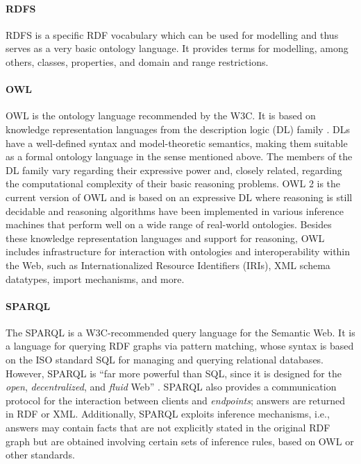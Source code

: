 \paragraph{RDFS}
\gls{RDFS} is a specific \gls{RDF} vocabulary which can be used for modelling
and thus serves as a very basic ontology language.
It provides terms for modelling, among others, classes, properties, and domain and range restrictions.

\paragraph{OWL}
%
\gls{OWL} is the ontology language recommended by the W3C.
It is based on knowledge representation languages from the description logic (DL) family \autocite{Baader2017}.
DLs have a well-defined syntax and model-theoretic semantics, making them suitable
as a formal ontology language in the sense mentioned above.
The members of the DL family vary regarding their expressive power and,
closely related, regarding the computational complexity of their basic reasoning problems.
OWL 2 is the current version of OWL and
is based on an expressive DL where reasoning is still decidable and reasoning algorithms have been implemented
in various inference machines that perform well on a wide range of real-world ontologies.
Besides these knowledge representation languages and support for reasoning,
OWL includes infrastructure for interaction with ontologies and interoperability
within the Web, such as Internationalized Resource Identifiers (IRIs),
%
\gls{XML} schema datatypes, import mechanisms, and more.

\paragraph{SPARQL}
The \gls{SPARQL} is a W3C-recom\-mend\-ed query language for the Semantic Web.
It is a language for querying \gls{RDF} graphs via pattern matching,
whose syntax is based on 
%
the ISO standard \gls{SQL} \cite{SQL} for managing and querying relational databases.
However, SPARQL is \enquote{far more powerful than SQL, since it is designed for the \emph{open}, \emph{decentralized}, and \emph{fluid} Web} \autocite{DellaValle2011}.
SPARQL also provides a communication protocol for the interaction between clients and \emph{endpoints};
answers are returned in \gls{RDF} or \gls{XML}.
Additionally, SPARQL exploits inference mechanisms,
i.e., answers may contain facts that are not explicitly stated in the original \gls{RDF} graph
but are obtained involving certain sets of inference rules, based on \gls{OWL} or other standards.

